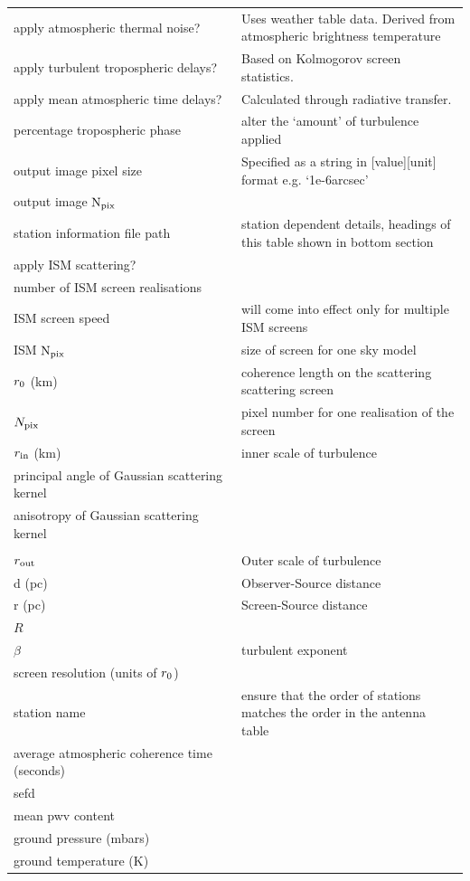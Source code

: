 \begin{longtable}{p{0.5\linewidth}|p{0.6\linewidth}}
apply atmospheric thermal noise?& Uses weather table data. Derived from atmospheric brightness temperature \\
apply turbulent tropospheric delays?&Based on Kolmogorov screen statistics.\\
apply mean atmospheric time delays?&Calculated through radiative transfer.\\
percentage tropospheric phase&alter the `amount' of turbulence applied\\
output image pixel size&Specified as a string in [value][unit] format e.g. `1e-6arcsec'\\
output image ${\rm N_{pix}}$&\\
station information file path& station dependent details, headings of this table shown in bottom section\\
\hline
\hline
apply ISM scattering?&\\
number of ISM screen realisations&  \\
ISM screen speed& will come into effect only for multiple ISM screens\\
ISM ${\rm N_{pix}}$& size of screen for one sky model\\
 $r_{\rm 0}$ (km) & coherence length on the scattering scattering screen \\
$N_{\rm pix}$& pixel number for one realisation of the screen \\
$r_{\rm in}$ (km)& inner scale of turbulence\\ 
principal angle of Gaussian scattering kernel &\\
anisotropy of Gaussian scattering kernel\\            \\
$r_{\rm out}$    & Outer scale of turbulence   \\
d (pc)      & Observer-Source distance      \\
r (pc)      & Screen-Source distance      \\
$R$              & \\
$\beta$ & turbulent exponent         \\
screen resolution (units of $r_{\rm 0}$)& \\
\hline
\hline
station name&ensure that the order of stations matches the order in the antenna table \\
average atmospheric coherence time (seconds)& \\
sefd&\\
mean pwv content&\\
ground pressure (mbars)&\\
ground temperature (K)&\\

\end{longtable}

